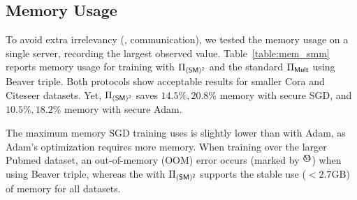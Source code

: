 \subsection{Memory Usage}
\label{sec::smmmemory}
To avoid extra irrelevancy (\eg, communication), we tested the memory usage
on a single server, recording the largest observed value.
Table~\ref{table:mem_smm} reports memory usage for training with $\Pi_{\mathsf{(SM)^2}}$ and the standard $\Pi_{\mathsf{Mult}}$ using Beaver triple.
Both protocols show acceptable results for
smaller Cora and Citeseer datasets.
Yet, $\Pi_{\mathsf{(SM)^2}}$ saves $14.5\%, 20.8\%$ memory with secure SGD,
and $10.5\%, 18.2\%$ memory with secure Adam.

The maximum memory SGD training uses is slightly lower than with Adam, as Adam's optimization requires more memory.
When training over the larger Pubmed dataset,
an out-of-memory (OOM) error occurs (marked by $^{\mathbin{\text{\textcircled{M}}}}$) when using Beaver triple, whereas the \cgnn with $\Pi_{\mathsf{(SM)^2}}$ supports the stable use (${<}2.7$GB) of memory for all datasets.

